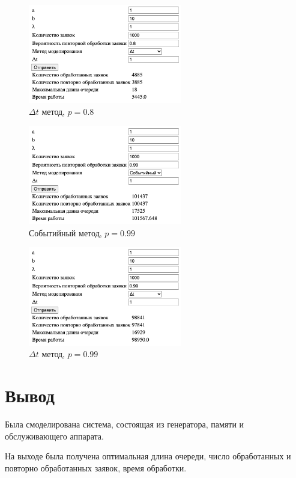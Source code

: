 \begin{figure}[H]
    \centering
    \includegraphics[width=0.6\textwidth]{img/content/dt_8.png}
    \caption{$\Delta t$ метод, $p = 0.8$}
\end{figure}

\begin{figure}[H]
    \centering
    \includegraphics[width=0.6\textwidth]{img/content/event_99.png}
    \caption{Событийный метод, $p = 0.99$}
\end{figure}

\begin{figure}[H]
    \centering
    \includegraphics[width=0.6\textwidth]{img/content/dt_99.png}
    \caption{$\Delta t$ метод, $p = 0.99$}
\end{figure}

\section{Вывод}

Была смоделирована система, состоящая из генератора, памяти и обслуживающего аппарата.

На выходе была получена оптимальная длина очереди, число обработанных и повторно обработанных заявок, время обработки.

